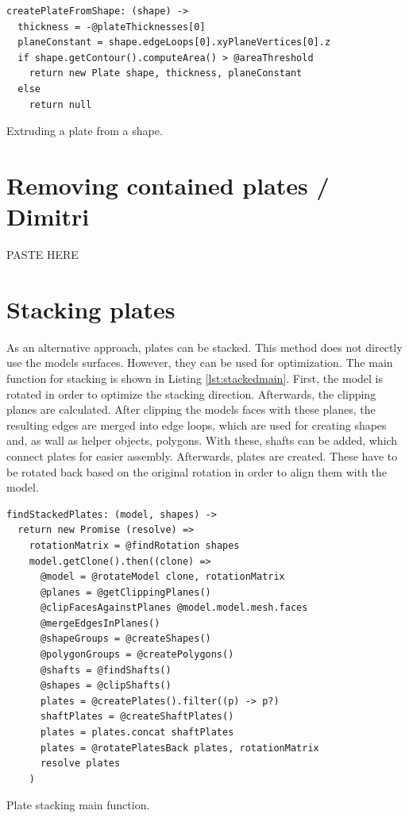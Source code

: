 \documentclass[../ClassicThesis.tex]{subfiles}
\begin{document}
\begin{listing}
\begin{verbatim}
createPlateFromShape: (shape) ->
  thickness = -@plateThicknesses[0]
  planeConstant = shape.edgeLoops[0].xyPlaneVertices[0].z
  if shape.getContour().computeArea() > @areaThreshold
    return new Plate shape, thickness, planeConstant
  else
    return null
\end{verbatim}
\caption{Extruding a plate from a shape.}
\label{lst:extrude}
\end{listing}

\section{Removing contained plates / Dimitri}

PASTE HERE

\section{Stacking plates}\label{sec:stackedplates}

As an alternative approach, plates can be stacked. This method does not directly use the models surfaces. However, they can be used for optimization.
The main function for stacking is shown in Listing \ref{lst:stackedmain}. First, the model is rotated in order to optimize the stacking direction. Afterwards, the clipping planes are calculated. After clipping the models faces with these planes, the resulting edges are merged into edge loops, which are used for creating shapes and, as wall as helper objects, polygons. With these, shafts can be added, which connect plates for easier assembly. Afterwards, plates are created. These have to be rotated back based on the original rotation in order to align them with the model. 

\begin{listing}
\begin{verbatim}
findStackedPlates: (model, shapes) ->
  return new Promise (resolve) =>
    rotationMatrix = @findRotation shapes
    model.getClone().then((clone) =>
      @model = @rotateModel clone, rotationMatrix
      @planes = @getClippingPlanes()
      @clipFacesAgainstPlanes @model.model.mesh.faces
      @mergeEdgesInPlanes()
      @shapeGroups = @createShapes()
      @polygonGroups = @createPolygons()
      @shafts = @findShafts()
      @shapes = @clipShafts()
      plates = @createPlates().filter((p) -> p?)
      shaftPlates = @createShaftPlates()
      plates = plates.concat shaftPlates
      plates = @rotatePlatesBack plates, rotationMatrix
      resolve plates
    )
\end{verbatim}
\caption{Plate stacking main function.}
\label{lst:stackedmain}
\end{listing}
\end{document}
